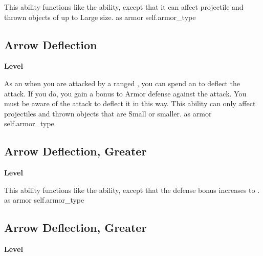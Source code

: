 \vspace{-1.5em}  %
This ability functions like the  ability, except that it can affect projectile and thrown objects of up to Large size.
 
 as armor
 {self.armor_type}
\begin{multicols}{2}
\lowercase{\hypertarget{item:Arrow Deflection}{}}\label{item:Arrow Deflection}
\hypertarget{item:Arrow Deflection}{\subsection{Arrow Deflection}}
\columnbreak%
\begin{flushright}
\large\textbf{ Level}
\end{flushright}
\end{multicols}
\vspace{-1.5em}  %
As an  when you are attacked by a ranged , you can spend an  to deflect the attack.
If you do, you gain a  bonus to Armor defense against the attack.
You must be aware of the attack to deflect it in this way.
This ability can only affect projectiles and thrown objects that are Small or smaller.
 
 as armor
 {self.armor_type}
\begin{multicols}{2}
\lowercase{\hypertarget{item:Arrow Deflection, Greater}{}}\label{item:Arrow Deflection, Greater}
\hypertarget{item:Arrow Deflection, Greater}{\subsection{Arrow Deflection, Greater}}
\columnbreak%
\begin{flushright}
\large\textbf{ Level}
\end{flushright}
\end{multicols}
\vspace{-1.5em}  %
This ability functions like the  ability, except that the defense bonus increases to .
 
 as armor
 {self.armor_type}
\begin{multicols}{2}
\lowercase{\hypertarget{item:Arrow Deflection, Greater}{}}\label{item:Arrow Deflection, Greater}
\hypertarget{item:Arrow Deflection, Greater}{\subsection{Arrow Deflection, Greater}}
\columnbreak%
\begin{flushright}
\large\textbf{ Level}
\end{flushright}
\end{multicols}
